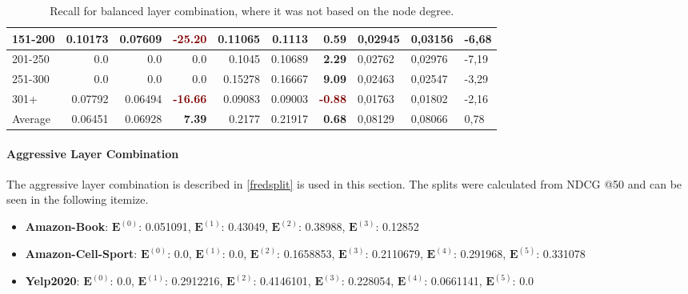 \begin{table*}[]
\begin{tabular}{|l|r|r|r||r|r|r||l|l|l|}
        151-200   & 0.10173                                 & 0.07609                       & \textbf{\textcolor{Maroon}{-25.20}}    & 0.11065                    & 0.1113                   & \textbf{\textcolor{OliveGreen}{0.59}} & 0,02945 & 0,03156     & -6,68 \\ \hline
        201-250   & 0.0                                     & 0.0                           & 0.0                                    & 0.1045                     & 0.10689                  & \textbf{\textcolor{OliveGreen}{2.29}} & 0,02762 & 0,02976     & -7,19 \\ \hline
        251-300   & 0.0                                     & 0.0                           & 0.0                                    & 0.15278                    & 0.16667                  & \textbf{\textcolor{OliveGreen}{9.09}} & 0,02463 & 0,02547     & -3,29 \\ \hline
        301+      & 0.07792                                 & 0.06494                       & \textbf{\textcolor{Maroon}{-16.66}}    & 0.09083                    & 0.09003                  & \textbf{\textcolor{Maroon}{-0.88}}    & 0,01763 & 0,01802     & -2,16 \\ \hline
        Average   & 0.06451                                 & 0.06928                       & \textbf{\textcolor{OliveGreen}{7.39}}  & 0.2177                     & 0.21917                  & \textbf{\textcolor{OliveGreen}{0.68}} & 0,08129 & 0,08066     & 0,78  \\ \hline
    \end{tabular}
    \caption{Recall for balanced layer combination, where it was not based on the node degree.}
    \label{tab:balanced-layer-combination-recall}
\end{table*}

\paragraph{Aggressive Layer Combination}
The aggressive layer combination is described in \autoref{fredsplit} is used in this section.
The splits were calculated from NDCG @50 and can be seen in the following itemize.
\begin{itemize}
    \item \textbf{Amazon-Book}: $\mathbf{E}^{(0)}$: 0.051091, $\mathbf{E}^{(1)}$: 0.43049, $\mathbf{E}^{(2)}$: 0.38988, $\mathbf{E}^{(3)}$:  0.12852
    \item \textbf{Amazon-Cell-Sport}: $\mathbf{E}^{(0)}$: 0.0, $\mathbf{E}^{(1)}$: 0.0, $\mathbf{E}^{(2)}$: 0.1658853, $\mathbf{E}^{(3)}$:  0.2110679, $\mathbf{E}^{(4)}$: 0.291968, $\mathbf{E}^{(5)}$: 0.331078
    \item \textbf{Yelp2020}: $\mathbf{E}^{(0)}$: 0.0, $\mathbf{E}^{(1)}$: 0.2912216, $\mathbf{E}^{(2)}$: 0.4146101, $\mathbf{E}^{(3)}$: 0.228054, $\mathbf{E}^{(4)}$: 0.0661141, $\mathbf{E}^{(5)}$: 0.0
\end{itemize}


